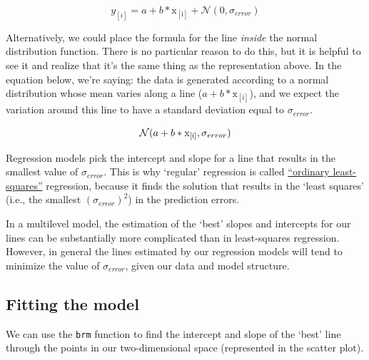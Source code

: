 \documentclass[
]{book}
\begin{document}
\[
y_{[i]} = a + b * \mathrm{x_{[i]}} + \mathcal{N}(0,\sigma_{error})
\label{eq:58}
\]

Alternatively, we could place the formula for the line \emph{inside} the normal distribution function. There is no particular reason to do this, but it is helpful to see it and realize that it's the same thing as the representation above. In the equation below, we're saying: the data is generated according to a normal distribution whose mean varies along a line (\(a + b * \mathrm{x_{[i]}}\)), and we expect the variation around this line to have a standard deviation equal to \(\sigma_{error}\).

\[
\mathcal{N}(a + b * \mathrm{x_{[i]}}, \sigma_{error})  \\
\label{eq:59}
\]

Regression models pick the intercept and slope for a line that results in the smallest value of \(\sigma_{error}\). This is why `regular' regression is called \href{https://en.wikipedia.org/wiki/Ordinary_least_squares}{``ordinary least-squares''} regression, because it finds the solution that results in the `least squares' (i.e., the smallest \((\sigma_{error})^2\)) in the prediction errors.

In a multilevel model, the estimation of the `best' slopes and intercepts for our lines can be substantially more complicated than in least-squares regression. However, in general the lines estimated by our regression models will tend to minimize the value of \(\sigma_{error}\), given our data and model structure.

\hypertarget{fitting-the-model-3}{%
\subsection{Fitting the model}\label{fitting-the-model-3}}

We can use the \texttt{brm} function to find the intercept and slope of the `best' line through the points in our two-dimensional space (represented in the scatter plot).
\end{document}
